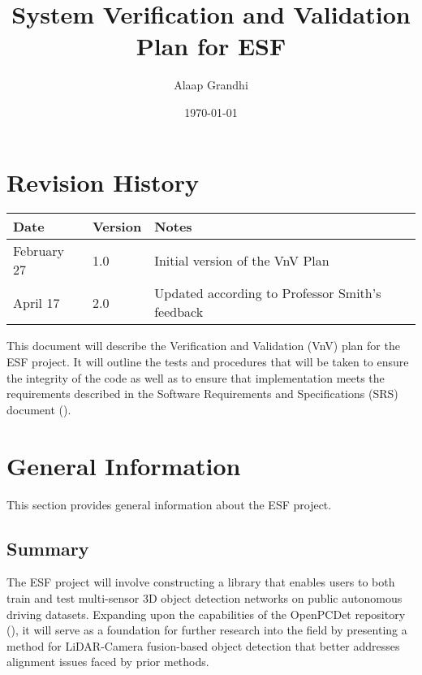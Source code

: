 \documentclass[12pt, titlepage]{article}
\newcommand{\ProjectName}{ESF }
\begin{document}
\title{System Verification and Validation Plan for \ProjectName{}} 
\author{Alaap Grandhi}
\date{\today}
	
\maketitle


\section*{Revision History}

\begin{tabularx}{\textwidth}{p{3cm}p{2cm}X}
\toprule {\bf Date} & {\bf Version} & {\bf Notes}\\
\midrule
February 27 & 1.0 & Initial version of the VnV Plan\\
April 17 & 2.0 & Updated according to Professor Smith's feedback\\
\bottomrule
\end{tabularx}

\newpage

\tableofcontents

\listoftables

\newpage


This document will describe the Verification and Validation (VnV) plan for the \ProjectName{}project. It will
outline the tests and procedures that will be taken to ensure the integrity of the code as well as to ensure that
implementation meets the requirements described in the Software Requirements and Specifications (SRS) document (\cite{SRS}).
\section{General Information}
This section provides general information about the \ProjectName{}project.
\subsection{Summary}

The \ProjectName{}project will involve constructing a library that enables users to both
train and test multi-sensor 3D object detection networks on public autonomous driving datasets. 
Expanding upon the capabilities of the OpenPCDet repository (\cite{openpcdet2020}), it will serve as a foundation for 
further research into the field by presenting a method for LiDAR-Camera fusion-based object 
detection that better addresses alignment issues faced by prior methods. 
\end{document}
